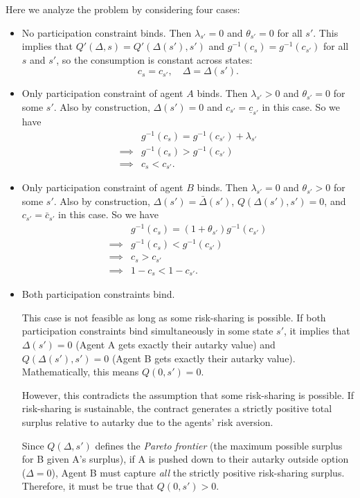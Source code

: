 Here we analyze the problem by considering four cases:
\begin{itemize}
    \item No participation constraint binds. Then $\lambda_{s'} = 0$ and $\theta_{s'} = 0$ for all $s'$. This implies that $Q'(\Delta,s) = Q'(\Delta(s'),s')$ and $g^{-1}(c_s) = g^{-1}(c_{s'})$ for all $s$ and $s'$, so the consumption is constant across states:
    \[
    c_s = c_{s'}, \quad \Delta = \Delta(s').
    \]
    \item Only participation constraint of agent $A$ binds. Then $\lambda_{s'}>0$ and $\theta_{s'} = 0$ for some $s'$. Also by construction, $\Delta(s') = 0$ and $c_{s'} = \underline{c}_{s'}$ in this case. So we have
    \[
    \begin{aligned}
        & g^{-1}(c_s)  = g^{-1}(c_{s'}) + \lambda_{s'}\\
        \implies & g^{-1}(c_s) > g^{-1}(c_{s'})\\
         \implies &  c_s < c_{s'}.
    \end{aligned}
    \]
    \item Only participation constraint of agent $B$ binds. Then $\lambda_{s'} = 0$ and $\theta_{s'} > 0$ for some $s'$. Also by construction, $\Delta(s') = \bar\Delta(s')$, $Q(\Delta(s'),s') = 0$, and $c_{s'} = \bar{c}_{s'}$ in this case. So we have
    \[
    \begin{aligned}
        & g^{-1}(c_s)  = (1+\theta_{s'})g^{-1}(c_{s'})\\
        \implies & g^{-1}(c_s) < g^{-1}(c_{s'})\\
         \implies &  c_s > c_{s'}\\
         \implies & 1-c_s<1-c_{s'}.
    \end{aligned}
    \]
    \item Both participation constraints bind. 
    
    This case is not feasible as long as some risk-sharing is possible. 
    If both participation constraints bind simultaneously in some state $s'$, it implies that $\Delta(s') = 0$ (Agent A gets exactly their autarky value) and $Q(\Delta(s'), s') = 0$ (Agent B gets exactly their autarky value). Mathematically, this means $Q(0, s') = 0$.
    
    However, this contradicts the assumption that some risk-sharing is possible. If risk-sharing is sustainable, the contract generates a strictly positive total surplus relative to autarky due to the agents' risk aversion. 
    
    Since $Q(\Delta, s')$ defines the \textit{Pareto frontier} (the maximum possible surplus for B given A's surplus), if A is pushed down to their autarky outside option ($\Delta = 0$), Agent B must capture \textit{all} the strictly positive risk-sharing surplus. Therefore, it must be true that $Q(0, s') > 0$. 
    

\end{itemize}

